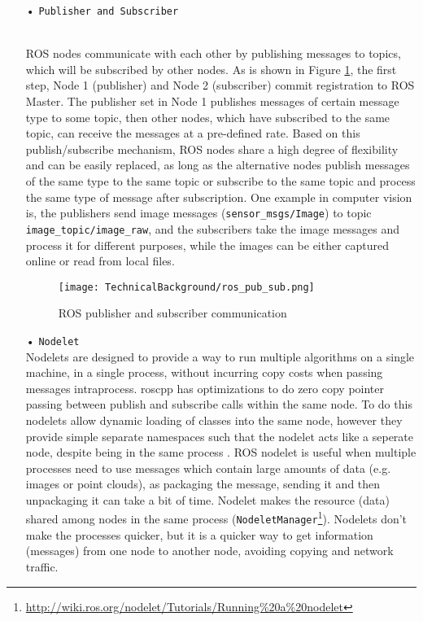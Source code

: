 \begin{description}[leftmargin=0in, labelindent=0pt]
{\begin{itemize}%
\item[•] \texttt{Publisher and Subscriber}{ \\ 
ROS nodes communicate with each other by publishing messages to topics, which will be subscribed by other nodes. As is shown in Figure \ref{fig:ros_pub_sub}, the first step, Node 1 (publisher) and Node 2 (subscriber) commit registration to ROS Master. The publisher set in Node 1 publishes messages of certain message type to some topic,	then other nodes, which have subscribed to the same topic, can receive the messages at a pre-defined rate. Based on this publish/subscribe mechanism, ROS nodes share a high degree of flexibility and can be easily replaced, as long as the alternative nodes publish messages of the same type to the same topic or subscribe to the same topic and process the same type of message after subscription. One example in computer vision is, the publishers send image messages (\texttt{sensor\_msgs/Image}) to topic \texttt{image\_topic/image\_raw}, and the subscribers take the image messages and process it for different purposes, while the images can be either captured online or read from local files.      

\begin{figure}[h!]
  \centering
  \texttt{[image: TechnicalBackground/ros\_pub\_sub.png]}
  \caption{ROS publisher and subscriber communication \cite{roseth2018}}
  \label{fig:ros_pub_sub}
\end{figure}
}

\item[•] \texttt{Nodelet} {\\
Nodelets are designed to provide a way to run multiple algorithms on a single machine, in a single process, without incurring copy costs when passing messages intraprocess. roscpp has optimizations to do zero copy pointer passing between publish and subscribe calls within the same node. To do this nodelets allow dynamic loading of classes into the same node, however they provide simple separate namespaces such that the nodelet acts like a seperate node, despite being in the same process \cite{rosnodelet}. ROS nodelet is useful when multiple processes need to use messages which contain large amounts of data (e.g. images or point clouds), as packaging the message, sending it and then unpackaging it can take a bit of time. Nodelet makes the resource (data) shared among nodes in the same process (\texttt{NodeletManager}\footnote{\url{http://wiki.ros.org/nodelet/Tutorials/Running\%20a\%20nodelet}}). Nodelets don't make the processes quicker, but it is a quicker way to get information (messages) from one node to another node, avoiding copying and network traffic.
} 



\end{itemize}}
\end{description}
